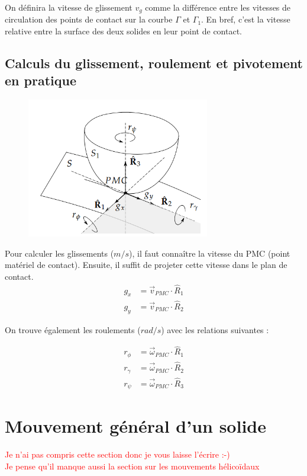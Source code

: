 On définira la vitesse de glissement $v_g$ comme la différence entre les vitesses de circulation des points de contact sur la courbe $\Gamma$ et $\Gamma_1$. En bref, c'est la vitesse relative entre la surface des deux solides en leur point de contact.

\subsection{Calculs du glissement, roulement et pivotement en pratique}


\begin{figure}[H]
    \centering
    \includegraphics[width = 8cm]{Images/imagesCinematique/glissementRoulement.png}
    \label{fig:my_label}
\end{figure}

Pour calculer les glissements ($m/s$), il faut connaître la vitesse du PMC (point matériel de contact). Ensuite, il suffit de projeter cette vitesse dans le plan de contact.
\begin{align*}
    g_x &= \Vec{v}_{PMC} \cdot \hat{R}_1\\
    g_y &= \Vec{v}_{PMC} \cdot \hat{R}_2
\end{align*}

On trouve également les roulements ($rad/s$) avec les relations suivantes : 

\begin{align*}
    r_{\phi} &= \Vec{\omega}_{PMC} \cdot \hat{R}_1\\
    r_{\gamma} &= \Vec{\omega}_{PMC} \cdot \hat{R}_2\\
    r_{\psi} &= \Vec{\omega}_{PMC} \cdot \hat{R}_3
\end{align*}

\section{Mouvement général d'un solide}
\textcolor{red}{Je n'ai pas compris cette section donc je vous laisse l'écrire :-)\\
Je pense qu'il manque aussi la section sur les mouvements hélicoïdaux}

